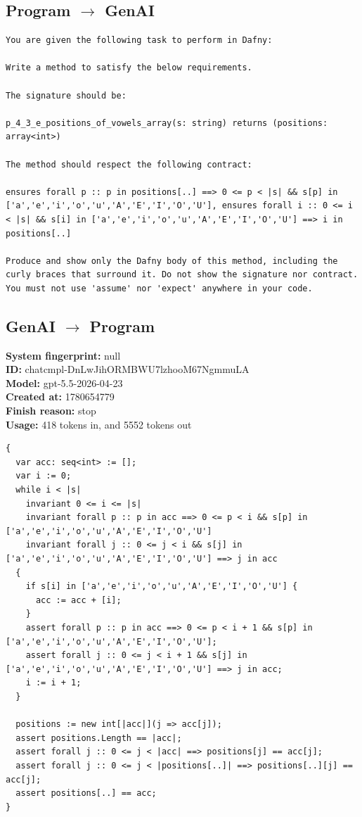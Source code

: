 \documentclass{article}
\begin{document}
\subsection*{Program $\rightarrow$ GenAI}
\begin{lstlisting}
You are given the following task to perform in Dafny:

Write a method to satisfy the below requirements.

The signature should be:

p_4_3_e_positions_of_vowels_array(s: string) returns (positions: array<int>)

The method should respect the following contract:

ensures forall p :: p in positions[..] ==> 0 <= p < |s| && s[p] in ['a','e','i','o','u','A','E','I','O','U'], ensures forall i :: 0 <= i < |s| && s[i] in ['a','e','i','o','u','A','E','I','O','U'] ==> i in positions[..]

Produce and show only the Dafny body of this method, including the curly braces that surround it. Do not show the signature nor contract. You must not use 'assume' nor 'expect' anywhere in your code.
\end{lstlisting}
\subsection*{GenAI $\rightarrow$ Program}
\textbf{System fingerprint: }null
\\\textbf{ID: }chatcmpl-DnLwJihORMBWU7lzhooM67NgmmuLA
\\\textbf{Model: }gpt-5.5-2026-04-23
\\\textbf{Created at: }1780654779
\\\textbf{Finish reason: }stop
\\\textbf{Usage: }418 tokens in, and 5552 tokens out
\begin{lstlisting}
{
  var acc: seq<int> := [];
  var i := 0;
  while i < |s|
    invariant 0 <= i <= |s|
    invariant forall p :: p in acc ==> 0 <= p < i && s[p] in ['a','e','i','o','u','A','E','I','O','U']
    invariant forall j :: 0 <= j < i && s[j] in ['a','e','i','o','u','A','E','I','O','U'] ==> j in acc
  {
    if s[i] in ['a','e','i','o','u','A','E','I','O','U'] {
      acc := acc + [i];
    }
    assert forall p :: p in acc ==> 0 <= p < i + 1 && s[p] in ['a','e','i','o','u','A','E','I','O','U'];
    assert forall j :: 0 <= j < i + 1 && s[j] in ['a','e','i','o','u','A','E','I','O','U'] ==> j in acc;
    i := i + 1;
  }

  positions := new int[|acc|](j => acc[j]);
  assert positions.Length == |acc|;
  assert forall j :: 0 <= j < |acc| ==> positions[j] == acc[j];
  assert forall j :: 0 <= j < |positions[..]| ==> positions[..][j] == acc[j];
  assert positions[..] == acc;
}
\end{lstlisting}
\end{document}
